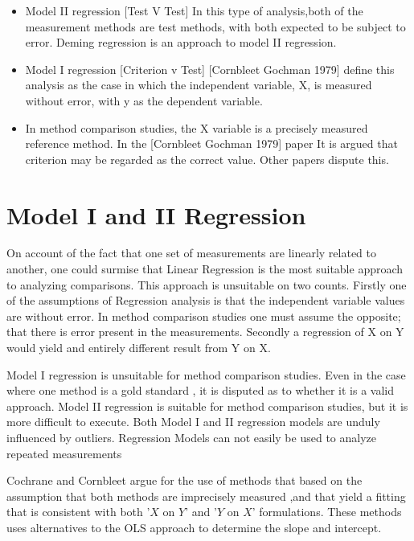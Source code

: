 \documentclass[12pt, a4paper]{report}
\theoremstyle{plain}
\theoremstyle{definition}
\theoremstyle{remark}
\begin{document}
\begin{itemize}
\item Model II regression [Test V Test] In this type of analysis,both of the measurement methods are test methods, with both expected to be subject to error. Deming regression is an approach to model II regression.

\item Model I regression [Criterion v Test] [Cornbleet Gochman 1979] define this analysis as the case in which the independent variable, X, is measured without error, with y as the dependent
variable.

\item In method comparison studies, the X variable is a precisely measured reference method. In the [Cornbleet Gochman 1979] paper It is argued that criterion may be regarded as the correct value.
Other papers dispute this.
\end{itemize}






\section{Model I and II Regression}

On account of the fact that one set of measurements are linearly related to another, one could surmise that Linear Regression is the most suitable approach to analyzing comparisons. This approach is unsuitable on two counts. Firstly one of the assumptions of Regression analysis is that the independent variable values are without error. In method comparison studies one must assume the opposite; that there is error present in the measurements. Secondly a regression of X on Y would yield and entirely different result from Y on X.

Model I regression is unsuitable for method comparison studies. Even in the case where one method is a gold standard , it is disputed as to whether it is a valid approach. Model II regression is suitable for method comparison studies, but it is more difficult to execute. Both Model I and II regression models are unduly influenced by outliers.
Regression Models can not easily be used to analyze repeated measurements


Cochrane and Cornbleet argue for the use of methods that based on
the assumption that both methods are imprecisely measured ,and
that yield a fitting that is consistent with both '$X$ on $Y$' and
'$Y$ on $X$' formulations. These methods uses alternatives to the
OLS approach to determine the slope and intercept.
\end{document}
